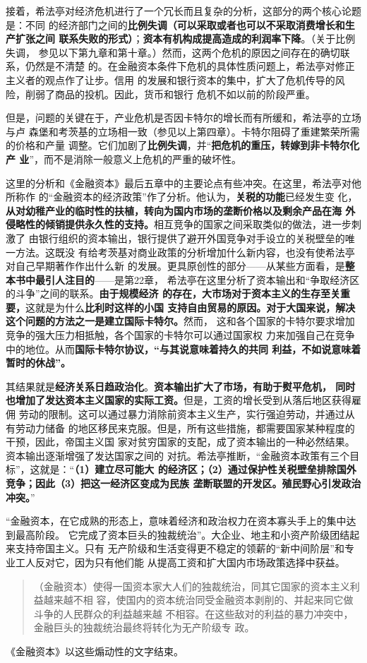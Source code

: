 接着，希法亭对经济危机进行了一个冗长而且复杂的分析，这部分的两个核心论题是：不同
的经济部门之间的\textbf{比例失调（可以采取或者也可以不采取消费增长和生产扩张之间
  联系失败的形式）}；\textbf{资本有机构成提高造成的利润率下降}。（关于比例失调，
参见以下第九章和第十章。）然而，这两个危机的原因之间存在的确切联系，仍然是不清楚
的。在金融资本条件下危机的具体性质问题上，希法亭对修正主义者的观点作了让步。信用
的发展和银行资本的集中，扩大了危机传导的风险，削弱了商品的投机。因此，货币和银行
危机不如以前的阶段严重。

但是，问题的关键在于，产业危机是否因卡特尔的增长而有所缓和，希法亭的立场与卢
森堡和考茨基的立场相一致（参见以上第四章）。卡特尔阻碍了重建繁荣所需的价格和产量
调整。它们加剧了\textbf{比例失调}，并“\textbf{把危机的重压，转嫁到非卡特尔化产
  业}”，而不是消除一般意义上危机的严重的破坏性。

这里的分析和《金融资本》最后五章中的主要论点有些冲突。在这里，希法亭对他所称作
的“金融资本的经济政策”作了分析。他认为，\textbf{关税的功能}已经发生变
化，\textbf{从对幼稚产业的临时性的扶植，转向为国内市场的垄断价格以及剩余产品在海
  外侵略性的倾销提供永久性的支持。}相互竞争的国家之间采取类似的做法，进一步刺激了
由银行组织的资本输出，银行提供了避开外国竞争对手设立的关税壁垒的唯一方法。这既没
有给考茨基对商业政策的分析增加什么新内容，也没有使希法亭对自己早期著作作出什么新
的发展。更具原创性的部分——从某些方面看，是\textbf{整本书中最引人注目的}——是第22章，
希法亭在这里分析了资本输出和“争取经济区的斗争”之间的联系。\textbf{由于规模经济
  的存在，大市场对于资本主义的生存至关重要，}这就是为什么\textbf{比利时这样的小国
  支持自由贸易的原因。对于大国来说，解决这个问题的方法之一是建立国际卡特尔。}然而，
这和各个国家的卡特尔要求增加竞争的强大压力相抵触，各个国家的卡特尔可以通过国家权
力来加强自己在竞争中的地位。从而\textbf{国际卡特尔协议，“与其说意味着持久的共同
  利益，不如说意味着暂时的休战”。}

其结果就是\textbf{经济关系日趋政治化}。\textbf{资本输出扩大了市场，有助于熨平危机，
  同时也增加了发达资本主义国家的实际工资。}但是，工资的增长受到从落后地区获得雇佣
劳动的限制。这可以通过暴力消除前资本主义生产，实行强迫劳动，并通过从有劳动力储备
的地区移民来克服。但是，所有这些措施，都需要国家某种程度的干预，因此，帝国主义国
家对贫穷国家的支配，成了资本输出的一种必然结果。资本输出逐渐增强了发达国家之间的
对抗。希法亭推断，“金融资本政策有三个目标”，这就是：“\textbf{（1）建立尽可能大
  的经济区；（2）通过保护性关税壁垒排除国外竞争；因此（3）把这一经济区变成为民族
  垄断联盟的开发区。殖民野心引发政治冲突。}”

“金融资本，在它成熟的形态上，意味着经济和政治权力在资本寡头手上的集中达到最高阶段。
它完成了资本巨头的独裁统治”。大企业、地主和小资产阶级团结起来支持帝国主义。只有
无产阶级和生活变得更不稳定的领薪的“新中间阶层”和专业工人反对它，因为只有他们能
从提高工资和扩大国内市场政策选择中获益。
\begin{quotation}
  （金融资本）使得一国资本家大人们的独裁统治，同其它国家的资本主义利益越来越不相
  容，使国内的资本统治同受金融资本剥削的、并起来同它做斗争的人民群众的利益越来越
  不相容。在这些敌对的利益的暴力冲突中，金融巨头的独裁统治最终将转化为无产阶级专
  政。
\end{quotation}
《金融资本》以这些煽动性的文字结束。

